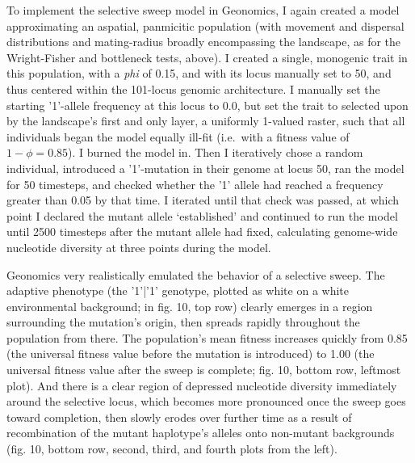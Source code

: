 ﻿\documentclass{article}
\begin{document}
To implement the selective sweep model in Geonomics, I again created a model
approximating an aspatial, panmicitic population (with movement and dispersal
distributions and mating-radius broadly encompassing the landscape, as for
the Wright-Fisher and bottleneck tests, above).
I created a single, monogenic trait in this population, with a \emph{phi} of
0.15, and with its locus manually set to 50, and thus centered
within the 101-locus genomic architecture. I manually set the starting 
'1'-allele frequency at this locus to 0.0, but set the trait to selected upon
by the landscape's first and only layer, a uniformly 1-valued raster, such
that all individuals began the model equally ill-fit (i.e.\ with a fitness value of
$1 - \phi = 0.85$). I burned the model in. Then I iteratively chose a random individual,
introduced a '1'-mutation in their genome at locus 50, ran the model for 50 timesteps,
and checked whether the '1' allele had reached a frequency greater than 0.05 by that
time. I iterated until that check was passed, at which point I declared
the mutant allele `established' and continued to run the model until 2500 timesteps
after the mutant allele had fixed, calculating genome-wide nucleotide diversity
at three points during the model.

Geonomics very realistically emulated the behavior of a selective sweep. The
adaptive phenotype (the '1'|'1' genotype, plotted as white
on a white environmental background; in fig. 10, top row) clearly
emerges in a region surrounding the mutation's origin, then spreads rapidly
throughout the population from there. The population's mean fitness increases
quickly from 0.85 (the universal fitness value before the mutation is
introduced) to 1.00 (the universal fitness value after the sweep is complete;
fig. 10, bottom row, leftmost plot). And there is a clear region of depressed
nucleotide diversity immediately around the selective locus, which becomes
more pronounced once the sweep goes toward completion, then slowly erodes
over further time as a result of recombination of the mutant haplotype's
alleles onto non-mutant backgrounds (fig. 10, bottom row, second, third, and
fourth plots from the left).
\end{document}
